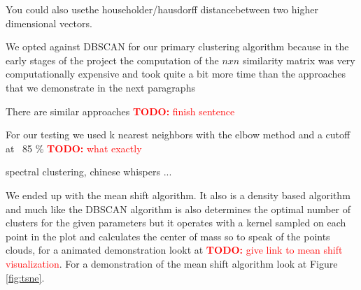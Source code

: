 \documentclass[journal]{vgtc}       %
\newcommand{\todo}[1]{\textcolor{red}{\textbf{TODO:} #1}}
\begin{document}
You could also usethe householder/hausdorff distancebetween two higher dimensional vectors.

We opted against DBSCAN for our primary clustering algorithm because in the early stages of the project the computation of the \(nxn\) similarity matrix was very computationally expensive and took quite a bit more time than the approaches that we demonstrate in the next paragraphs

There are similar approaches \todo{finish sentence}

For our testing we used k nearest neighbors with the elbow method and a cutoff at  ~85 \% \todo{what exactly}

spectral clustering, chinese whispers  ... 

We ended up with the mean shift algorithm. It also is a density based algorithm and much like the DBSCAN algorithm is also determines the optimal number of clusters for the given parameters but it operates with a kernel sampled on each point in the plot and calculates the center of mass so to speak of the points clouds, for a animated demonstration lookt at \todo{give link to mean shift visualization}. For a demonstration of the mean shift algorithm look at Figure \ref{fig:tsne}. 
\end{document}
